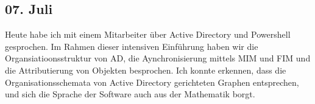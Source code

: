 \subsection{07. Juli}
Heute habe ich mit einem Mitarbeiter über Active Directory und Powershell gesprochen. Im Rahmen dieser intensiven Einführung haben wir die Organsiatioonsstruktur von AD, die Aynchronisierung mittels MIM und FIM und die Attributierung von Objekten besprochen. Ich konnte erkennen, dass die Organisationsschemata von Active Directory gerichteten Graphen entsprechen, und sich die Sprache der Software auch aus der Mathematik borgt.